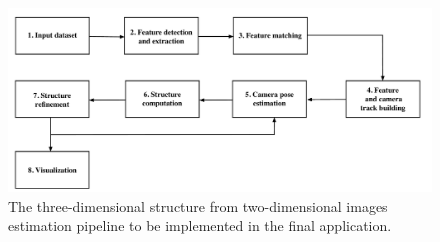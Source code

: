 \begin{figure}[t]
	\begin{center}
		\includegraphics[keepaspectratio,width=\textwidth]{fig/pipeline.pdf}
	\end{center}
	\caption{The three-dimensional structure from two-dimensional images estimation pipeline to be implemented in the final application.}
	\label{fig:pipeline}
\end{figure}

